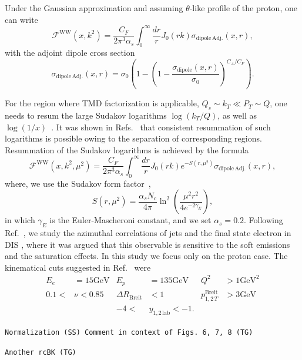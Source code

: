 \documentclass[11pt]{article}
\newcommand{\fww}[0]{\mathcal{F}^{\mathrm{WW}}}
\newcommand{\sdp}[0]{\sigma_{\mathrm{dipole}}}
\newcommand{\sdpa}[0]{\sigma_{\mathrm{dipole\,Adj.}}}
\newcommand{\GeV}[0]{\mathrm{GeV}}
\newcommand{\comment}[1]{\texttt{\color{red}#1}}
\begin{document}
Under the Gaussian approximation and assuming $\theta$-like profile of the
proton, one can
write~\cite{vanHameren:2016ftb,Xiao:2017ggh,Dominguez:2010xd,Dominguez:2011wm}
%
\begin{equation}
\fww(x,k^2)= \frac{C_F}{2\pi^3\alpha_s}\int^\infty_0\frac{dr}{r}J_0(r k) \sdpa(x,r),
\end{equation} 	
with the adjoint dipole cross section
\begin{equation}
\sdpa(x,r)=\sigma_0\left( 1-\left(1-\frac{\sdp(x,r)}{\sigma_0}\right)^{C_A/C_F}\right).
\label{eq:ww}
\end{equation}

For the region where TMD factorization is applicable, $Q_s\sim k_T\ll P_T\sim
Q$, one needs to resum the large Sudakov logarithms $\log(k_T/Q)$, as well as
$\log(1/x)$~\cite{Dominguez:2011wm}. It was shown in
Refs.~\cite{Mueller:2012uf,Mueller:2013wwa,Xiao:2017yya} that consistent
resummation of such logarithms is possible owing to the separation of
corresponding regions.  Resummation of the Sudakov logarithms is achieved by the
formula
%
\begin{equation}
	\fww(x,k^2,\mu^2)= \frac{C_F}{2\pi^3\alpha_s}\int^\infty_0\frac{dr}{r}J_0(r k) e^{-S(r,\mu^2)} \sdpa(x,r),
	\label{eq:ww-sud}
\end{equation}
%
where, we use the Sudakov form factor~\cite{Mueller:2013wwa,Xiao:2017yya},
%
\begin{equation}
	S(r,\mu^2)=\frac{\alpha_s N_c}{4\pi}\ln^2\left(\frac{\mu^2r^2}{4e^{-2\gamma_E}}\right),
\end{equation}
%
in which $\gamma_E$ is the Euler-Mascheroni constant, and we set $\alpha_s=0.2$. 
Following Ref.~\cite{vanHameren:2021sqc}, we study the azimuthal correlations of
jets and the final state electron in DIS , where
it was argued that this observable is sensitive to the soft emissions and the
saturation effects. In this study we focus only on the proton case.  The
kinematical cuts suggested in Ref.~\cite{vanHameren:2021sqc} were
%
\begin{align*}
	E_e&=15\GeV& E_p&=135\GeV& Q^2&>1\GeV^2\\
	0.1<&\nu<0.85&\Delta R_{\mathrm{Breit}}&<1&p^{\mathrm{Breit}}_{1,2\,T}&>3\GeV\\
	&&-4<&y_{1,2\,\mathrm{lab}}<-1.&&
\end{align*}

\comment{Normalization (SS) Comment in context of Figs. 6, 7, 8 (TG)}

\comment{Another rcBK (TG)}
\end{document}
